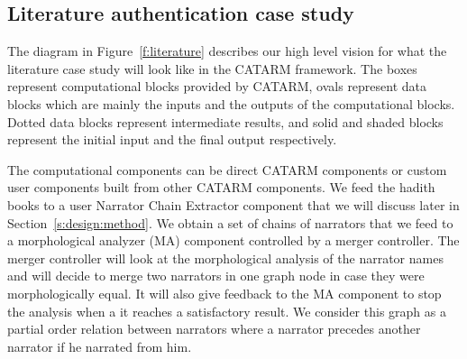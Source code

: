 \documentclass[12pt]{article}
\begin{document}
{\subsection{Literature authentication case study}
\label{s:design:lit}

\begin{figure}
\end{figure}

The diagram in Figure~\ref{f:literature} describes our 
high level vision for what the literature case study
will look like in the CATARM framework. 
The boxes represent 
computational blocks provided by CATARM, 
ovals represent data blocks which are mainly the 
inputs and the outputs of the computational blocks. 
Dotted data blocks represent intermediate results,
and solid and shaded blocks represent the initial input 
and the final output respectively. 

The computational components can be direct CATARM components
or custom user components built from other CATARM components.
We feed the hadith books to a user Narrator Chain Extractor
component that we will discuss later in 
Section~\ref{s:design:method}. We  obtain a set of chains
of narrators that we feed to a morphological analyzer (MA) 
component controlled by a merger controller. 
The merger controller will look at the morphological analysis
of the narrator names and will decide to merge two narrators in 
one graph node in case they were morphologically equal. 
It will also give feedback to the MA component to stop the
analysis when a it reaches a satisfactory result.
We consider this graph as a partial order relation between 
narrators where a narrator precedes another narrator if 
he narrated from him. 

}
\end{document}
